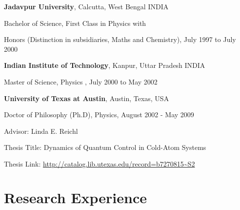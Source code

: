 \documentclass[a4paper,11pt,color]{article}
\newenvironment{list1}{
  \begin{list}{\ding{113}}{%
      \setlength{\itemsep}{0in}
      \setlength{\parsep}{0in} \setlength{\parskip}{0in}
      \setlength{\topsep}{0in} \setlength{\partopsep}{0in} 
      \setlength{\leftmargin}{0.17in}}}{\end{list}}
\begin{document}
{\bf Jadavpur University}, Calcutta, West Bengal INDIA\\
\vspace*{-.2in}
\begin{list1}
\item[] Bachelor of Science, First Class in Physics with 
\item[] Honors  (Distinction in subsidiaries, Maths and Chemistry),  July 1997 to July 2000
\end{list1}
{\bf Indian Institute of Technology}, Kanpur, Uttar Pradesh INDIA\\
\vspace*{-.2in}
\begin{list1}
\item[] Master of Science, Physics ,  July 2000 to May 2002
\end{list1}
{\bf University of Texas at Austin}, Austin, Texas, USA\\
\vspace*{-.2in}
\begin{list1}
\item[] Doctor of Philosophy (Ph.D), Physics, August 2002 - May 2009
\item[] Advisor:  Linda E. Reichl
\item[] Thesis Title: Dynamics of Quantum Control in Cold-Atom Systems
\item[] Thesis Link: \url{http://catalog.lib.utexas.edu/record=b7270815~S2}
\end{list1}

\section{\sc Research Experience}
\end{document}
